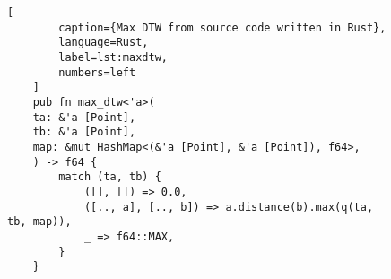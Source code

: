 \begin{figure}
    \begin{lstlisting}[
        caption={Max DTW from source code written in Rust},
        language=Rust,
        label=lst:maxdtw,
        numbers=left
    ]
    pub fn max_dtw<'a>(
    ta: &'a [Point],
    tb: &'a [Point],
    map: &mut HashMap<(&'a [Point], &'a [Point]), f64>,
    ) -> f64 {
        match (ta, tb) {
            ([], []) => 0.0,
            ([.., a], [.., b]) => a.distance(b).max(q(ta, tb, map)),
            _ => f64::MAX,
        }
    }
    \end{lstlisting}
\end{figure}